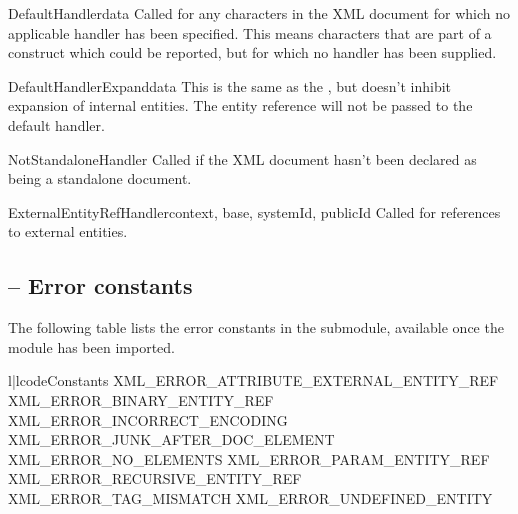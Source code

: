 \begin{methoddesc}{DefaultHandler}{data}
Called for any characters in the XML document for
which no applicable handler has been specified.  This means
characters that are part of a construct which could be reported, but
for which no handler has been supplied. 
\end{methoddesc}

\begin{methoddesc}{DefaultHandlerExpand}{data}
This is the same as the , 
but doesn't inhibit expansion of internal entities.
The entity reference will not be passed to the default handler.
\end{methoddesc}

\begin{methoddesc}{NotStandaloneHandler}{}
Called if the XML document hasn't been declared as being a standalone document.
\end{methoddesc}

\begin{methoddesc}{ExternalEntityRefHandler}{context, base, systemId, publicId}
Called for references to external entities.  
\end{methoddesc}





\subsection{ -- Error constants}

The following table lists the error constants in the
 submodule, available once the  module has been imported.

\begin{tableii}{l|l}{code}{Constants}{}{}
        {XML_ERROR_ATTRIBUTE_EXTERNAL_ENTITY_REF}
        {XML_ERROR_BINARY_ENTITY_REF}
        {XML_ERROR_INCORRECT_ENCODING}
        {XML_ERROR_JUNK_AFTER_DOC_ELEMENT}
        {XML_ERROR_NO_ELEMENTS} 
        {XML_ERROR_PARAM_ENTITY_REF}
        {XML_ERROR_RECURSIVE_ENTITY_REF}
	{XML_ERROR_TAG_MISMATCH}
        {XML_ERROR_UNDEFINED_ENTITY}
\end{tableii}


